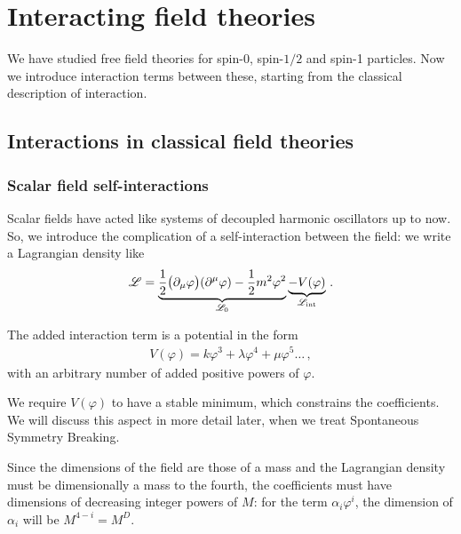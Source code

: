 \documentclass[main.tex]{subfiles}
\begin{document}
\chapter{Interacting field theories}

We have studied free field theories for spin-0, spin-\(1/2\) and spin-1 particles. Now we introduce interaction terms between these, starting from the classical description of interaction. 

\section{Interactions in classical field theories}


\subsection{Scalar field self-interactions}

Scalar fields have acted like systems of decoupled harmonic oscillators up to now. So, we introduce the complication of a self-interaction between the field: we write a Lagrangian density like 
%
\begin{align}
\mathscr{L} = \underbrace{\frac{1}{2} \qty(\partial_{\mu }\varphi ) \qty(\partial^{\mu} \varphi ) - \frac{1}{2} m^2 \varphi^2}_{\mathscr{L}_{0}} \underbrace{- V(\varphi )}_{\mathscr{L} _{\text{int}}}
\,.
\end{align}

The added interaction term is a potential in the form 
%
\begin{align}
V(\varphi ) = k \varphi^3 + \lambda \varphi^{4} + \mu \varphi^{5} \dots
\,,
\end{align}
%
with an arbitrary number of added positive powers of \(\varphi \). 

We require \(V(\varphi )\) to have a stable minimum, which constrains the coefficients. 
We will discuss this aspect in more detail later, when we treat Spontaneous Symmetry Breaking. 


Since the dimensions of the field are those of a mass and the Lagrangian density must be dimensionally a mass to the fourth, the coefficients must have dimensions of decreasing integer powers of \(M\): for the term \(\alpha_{i} \varphi^{i}\), the dimension of \(\alpha_{i}\) will be \(M^{4-i} = M^{D}\). 
\end{document}
